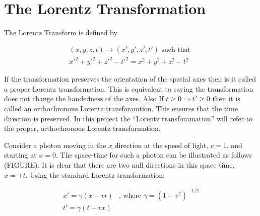 \section{The Lorentz Transformation}

The Lorentz Transform is defined by 

\begin{eqnarray*}
(x,y,z,t) \rightarrow (x',y',z',t') \text{ such that } \\
{x'}^2 + {y'}^2 + {z'}^2 - {t'}^2 = x^2 + y^2 + z^2 - t^2 
\end{eqnarray*}

\noindent If the transformation preserves the orientation of the spatial axes then is it called a proper Lorentz transformation. This is equivalent to saying the transformation does not change the handedness of the axes. Also If $t \geq 0 \Rightarrow t' \geq 0$ then it is called an orthochronous Lorentz transforamtion. This ensures that the time direction is preserved. In this project the ``Lorentz transforamation'' will refer to the proper, orthochronous Lorentz transformation.

Consider a photon moving in the $x$ direction at the speed of light, $c = 1$, and starting at $x = 0$. The space-time for such a photon can be illustrated as follows (FIGURE). It is clear that there are two null directions in this space-time, $x = \pm t$. Using the standard Lorentz transformation:

\begin{eqnarray*}
x'  = \gamma (x - vt) & \text{, where } \gamma = {(1 - v^2)}^{-1/2} \\
t'  = \gamma (t - vx) & 
\end{eqnarray*} 
